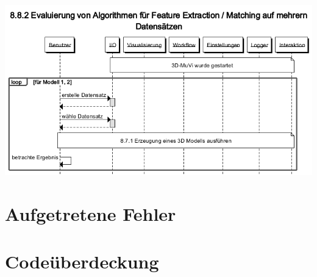 \includegraphics[width=1.05\textwidth]{img/882_Seqz.png}

\section{Aufgetretene Fehler}
\section{Codeüberdeckung}